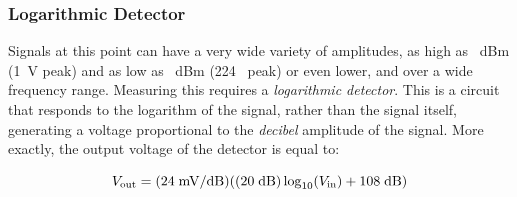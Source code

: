 \subsubsection{Logarithmic Detector}

Signals at this point can have a very wide variety of amplitudes, as high as ~dBm
(1~V peak) and as low as ~dBm (224~\uV{} peak) or even lower, and over a wide
frequency range. Measuring this requires a \emph{logarithmic detector}. This is a
circuit that responds to the logarithm of the signal, rather than the signal itself,
generating a voltage proportional to the \emph{decibel} amplitude of the signal. More
exactly, the output voltage of the detector is equal to:

\begin{equation*}
    V_\mathrm{out} = (24\;\mathrm{mV/dB})((20\;\mathrm{dB})\log_{10}(V_\mathrm{in}) + 108\;\mathrm{dB})
\end{equation*}
